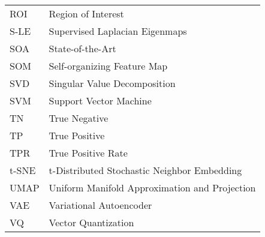 \begin{longtable}{l p{5in}}
ROI & Region of Interest\\
S-LE & Supervised Laplacian Eigenmaps\\
SOA & State-of-the-Art\\
SOM & Self-organizing Feature Map\\
SVD & Singular Value Decomposition\\
SVM & Support Vector Machine\\
TN & True Negative\\
TP & True Positive\\
TPR & True Positive Rate\\
t-SNE & t-Distributed Stochastic Neighbor Embedding\\
UMAP & Uniform Manifold Approximation and Projection\\
VAE & Variational Autoencoder\\
VQ & Vector Quantization\\

 \end{longtable}



\doublespacing

